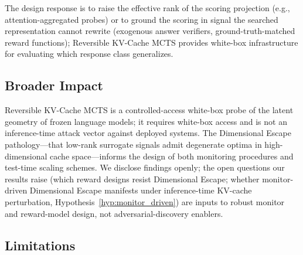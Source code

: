 The design response is to raise the effective rank of the scoring projection (e.g., attention-aggregated probes) or to ground the scoring in signal the searched representation cannot rewrite (exogenous answer verifiers, ground-truth-matched reward functions); Reversible KV-Cache MCTS provides white-box infrastructure for evaluating which response class generalizes.

\subsection{Broader Impact}

Reversible KV-Cache MCTS is a controlled-access white-box probe of the latent geometry of frozen language models; it requires white-box access and is not an inference-time attack vector against deployed systems. The Dimensional Escape pathology---that low-rank surrogate signals admit degenerate optima in high-dimensional cache space---informs the design of both monitoring procedures and test-time scaling schemes. We disclose findings openly; the open questions our results raise (which reward designs resist Dimensional Escape; whether monitor-driven Dimensional Escape manifests under inference-time KV-cache perturbation, Hypothesis~\ref{hyp:monitor_driven}) are inputs to robust monitor and reward-model design, not adversarial-discovery enablers.

\subsection{Limitations}

